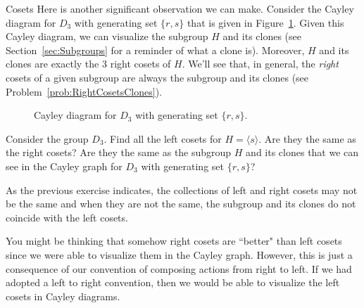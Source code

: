 \begin{section}{Cosets}
Here is another significant observation we can make.  Consider the Cayley diagram for $D_3$ with generating set $\{r,s\}$ that is given in Figure~\ref{fig:D3_repeat}. Given this Cayley diagram, we can visualize the subgroup $H$ and its clones (see Section~\ref{sec:Subgroups} for a reminder of what a clone is).  Moreover, $H$ and its clones are exactly the 3 right cosets of $H$.  We'll see that, in general, the \emph{right} cosets of a given subgroup are always the subgroup and its clones (see Problem~\ref{prob:RightCosetsClones}).


\begin{figure}[!ht]
\centering
{}
\caption{Cayley diagram for $D_3$ with generating set $\{r,s\}$.}
\label{fig:D3_repeat}
\end{figure}

\begin{problem}\label{prob:left_cosets_D3}
Consider the group $D_3$.  Find all the left cosets for $H=\langle s\rangle$.  Are they the same as the right cosets?  Are they the same as the subgroup $H$ and its clones that we can see in the Cayley graph for $D_3$ with generating set $\{r,s\}$?
\end{problem}

As the previous exercise indicates, the collections of left and right cosets may not be the same and when they are not the same, the subgroup and its clones do not coincide with the left cosets.

You might be thinking that somehow right cosets are ``better" than left cosets since we were able to visualize them in the Cayley graph.  However, this is just a consequence of our convention of composing actions from right to left.  If we had adopted a left to right convention, then we would be able to visualize the left cosets in Cayley diagrams.  


\end{section}
